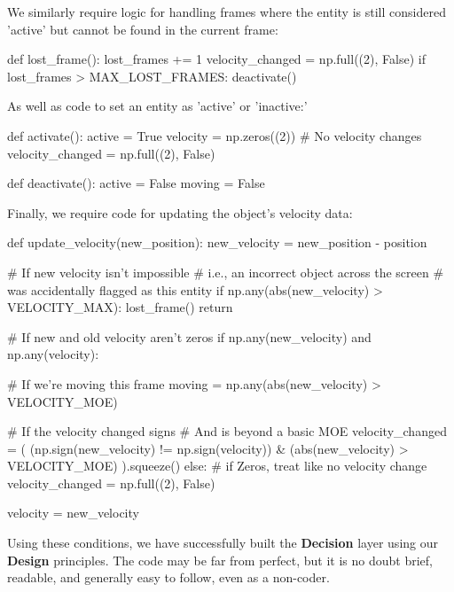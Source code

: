\documentclass{report}
\newcommand{\design}{\textbf{Design}\xspace}
\newcommand{\decision}{\textbf{Decision}\xspace}
\begin{document}
We similarly require logic for handling frames where the entity is still considered 'active' but cannot be found in the current frame:

\begin{codeblock}
def lost_frame():
    lost_frames += 1
    velocity_changed = np.full((2), False)
    if lost_frames > MAX_LOST_FRAMES:
        deactivate()    
\end{codeblock}

As well as code to set an entity as 'active' or 'inactive:'

\begin{codeblock}
 def activate():
    active = True
    velocity = np.zeros((2))
    # No velocity changes
    velocity_changed = np.full((2), False)   
\end{codeblock}

\begin{codeblock}
def deactivate():
    active = False
    moving = False    
\end{codeblock}

Finally, we require code for updating the object's velocity data:

\begin{codeblock}
def update_velocity(new_position):
    new_velocity = new_position - position

    # If new velocity isn't impossible
    # i.e., an incorrect object across the screen
    # was accidentally flagged as this entity
    if np.any(abs(new_velocity) > VELOCITY_MAX):
        lost_frame()
        return

    # If new and old velocity aren't zeros
    if np.any(new_velocity) and np.any(velocity):

        # If we're moving this frame
        moving = np.any(abs(new_velocity) > VELOCITY_MOE)

        # If the velocity changed signs
        # And is beyond a basic MOE
        velocity_changed = (
            (np.sign(new_velocity) != np.sign(velocity))
            & (abs(new_velocity) > VELOCITY_MOE)
        ).squeeze()
    else:  # if Zeros, treat like no velocity change
        velocity_changed = np.full((2), False)

    velocity = new_velocity
\end{codeblock}

Using these conditions, we have successfully built the \decision layer using our \design principles. The code may be far from perfect, but it is no doubt brief, readable, and generally easy to follow, even as a non-coder.
\end{document}
